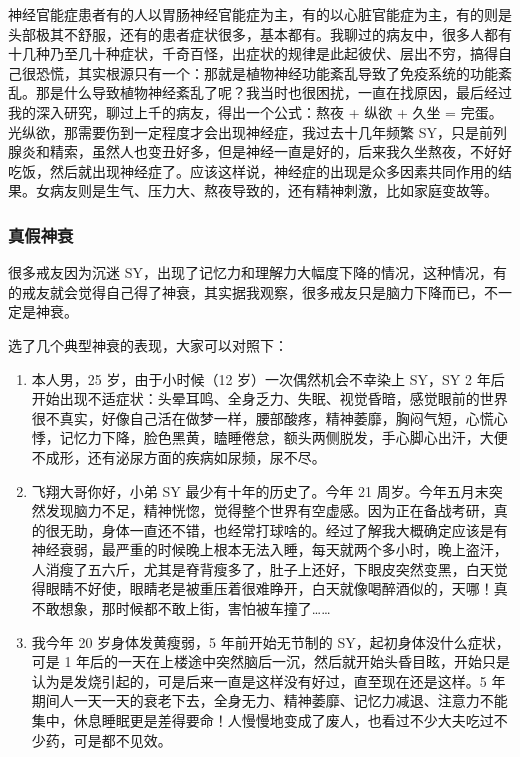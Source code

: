 \documentclass{ctexart}
\begin{document}
神经官能症患者有的人以胃肠神经官能症为主，有的以心脏官能症为主，有的则是头部极其不舒服，还有的患者症状很多，基本都有。我聊过的病友中，很多人都有十几种乃至几十种症状，千奇百怪，出症状的规律是此起彼伏、层出不穷，搞得自己很恐慌，其实根源只有一个：那就是植物神经功能紊乱导致了免疫系统的功能紊乱。那是什么导致植物神经紊乱了呢？我当时也很困扰，一直在找原因，最后经过我的深入研究，聊过上千的病友，得出一个公式：熬夜 + 纵欲 + 久坐 = 完蛋。光纵欲，那需要伤到一定程度才会出现神经症，我过去十几年频繁 SY，只是前列腺炎和精索，虽然人也变丑好多，但是神经一直是好的，后来我久坐熬夜，不好好吃饭，然后就出现神经症了。应该这样说，神经症的出现是众多因素共同作用的结果。女病友则是生气、压力大、熬夜导致的，还有精神刺激，比如家庭变故等。

\subsubsection{真假神衰}

很多戒友因为沉迷 SY，出现了记忆力和理解力大幅度下降的情况，这种情况，有的戒友就会觉得自己得了神衰，其实据我观察，很多戒友只是脑力下降而已，不一定是神衰。

选了几个典型神衰的表现，大家可以对照下：

\begin{enumerate}
    \item 本人男，25 岁，由于小时候（12 岁）一次偶然机会不幸染上 SY，SY 2 年后开始出现不适症状：头晕耳鸣、全身乏力、失眠、视觉昏暗，感觉眼前的世界很不真实，好像自己活在做梦一样，腰部酸疼，精神萎靡，胸闷气短，心慌心悸，记忆力下降，脸色黑黄，瞌睡倦怠，额头两侧脱发，手心脚心出汗，大便不成形，还有泌尿方面的疾病如尿频，尿不尽。
    \item 飞翔大哥你好，小弟 SY 最少有十年的历史了。今年 21 周岁。今年五月末突然发现脑力不足，精神恍惚，觉得整个世界有空虚感。因为正在备战考研，真的很无助，身体一直还不错，也经常打球啥的。经过了解我大概确定应该是有神经衰弱，最严重的时候晚上根本无法入睡，每天就两个多小时，晚上盗汗，人消瘦了五六斤，尤其是脊背瘦多了，肚子上还好，下眼皮突然变黑，白天觉得眼睛不好使，眼睛老是被重压着很难睁开，白天就像喝醉酒似的，天哪！真不敢想象，那时候都不敢上街，害怕被车撞了……
    \item 我今年 20 岁身体发黄瘦弱，5 年前开始无节制的 SY，起初身体没什么症状，可是 1 年后的一天在上楼途中突然脑后一沉，然后就开始头昏目眩，开始只是认为是发烧引起的，可是后来一直是这样没有好过，直至现在还是这样。5 年期间人一天一天的衰老下去，全身无力、精神萎靡、记忆力减退、注意力不能集中，休息睡眠更是差得要命！人慢慢地变成了废人，也看过不少大夫吃过不少药，可是都不见效。
\end{enumerate}
\end{document}
